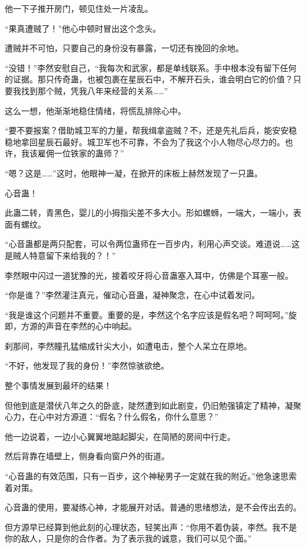 \begin{this_body}
他一下子推开房门，顿见住处一片凌乱。

“果真遭贼了！”他心中顿时冒出这个念头。

遭贼并不可怕，只要自己的身份没有暴露，一切还有挽回的余地。

“没错！”李然安慰自己，“我每次和武家，都是单线联系。手中根本没有留下任何的证据。那只传奇蛊，也被包裹在星辰石中，不解开石头，谁会明白它的价值？只要我找到那个贼，凭我八年来经营的关系……”

这么一想，他渐渐地稳住情绪，将慌乱排除心中。

“要不要报案？借助城卫军的力量，帮我缉拿盗贼？不，还是先礼后兵，能安安稳稳地拿回星辰石最好。城卫军也不可靠，不会为了我这个小人物尽心尽力的。也许，我该雇佣一位铁家的蛊师？”

“嗯？这是……”这时，他眼神一凝，在掀开的床板上赫然发现了一只蛊。

心音蛊！

此蛊二转，青黑色，婴儿的小拇指尖差不多大小。形如螺蛳，一端大，一端小，表面有螺纹。

“心音蛊都是两只配套，可以令两位蛊师在一百步内，利用心声交谈。难道说……这是贼人特意留下来给我的？！”

李然眼中闪过一道犹豫的光，接着咬牙将心音蛊塞入耳中，仿佛是个耳塞一般。

“你是谁？”李然灌注真元，催动心音蛊，凝神聚念，在心中试着发问。

“我是谁这个问题并不重要。重要的是，李然这个名字应该是假名吧？呵呵呵。”旋即，方源的声音在李然的心中响起。

刹那间，李然瞳孔猛缩成针尖大小，如遭电击，整个人呆立在原地。

“不好，他发现了我的身份！”李然惊骇欲绝。

整个事情发展到最坏的结果！

但他到底是潜伏八年之久的卧底，陡然遭到如此剧变，仍旧勉强镇定了精神，凝聚心力，在心中对方源道：“假名？什么假名，你什么意思？”

他一边说着，一边小心翼翼地踮起脚尖，在简陋的房间中行走。

然后背靠在墙壁上，侧身看向窗户外的街道。

“心音蛊的有效范围，只有一百步，这个神秘男子一定就在我的附近。”他急速思索着对策。

心音蛊的使用，要凝练心神，才能展开对话。普通的思绪想法，是不会传出去的。

但方源早已经算到他此刻的心理状态，轻笑出声：“你用不着伪装，李然。我不是你的敌人，只是你的合作者。为了表示我的诚意，我们可以见个面。”


\end{this_body}
